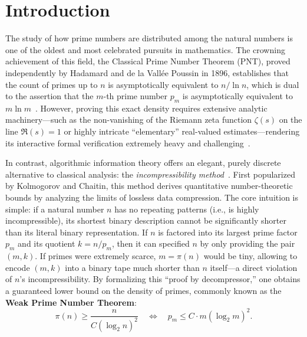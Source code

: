 \documentclass[acmsmall,natbib=false,nonacm]{acmart}
\begin{document}
\maketitle

\section{Introduction}
\label{sec:introduction}

The study of how prime numbers are distributed among the natural numbers is one of the oldest and most celebrated pursuits in mathematics. The crowning achievement of this field, the Classical Prime Number Theorem (PNT), proved independently by Hadamard and de la Vall\'{e}e Poussin in 1896, establishes that the count of primes up to $n$ is asymptotically equivalent to $n / \ln n$, which is dual to the assertion that the $m$-th prime number $p_m$ is asymptotically equivalent to $m \ln m$~\cite{apostol1976introduction}. However, proving this exact density requires extensive analytic machinery—such as the non-vanishing of the Riemann zeta function $\zeta(s)$ on the line $\Re(s) = 1$ or highly intricate ``elementary'' real-valued estimates—rendering its interactive formal verification extremely heavy and challenging~\cite{avigad2007formalPNT}.

In contrast, algorithmic information theory offers an elegant, purely discrete alternative to classical analysis: the \textit{incompressibility method}~\cite{schoning1998gems, li2019introduction}. First popularized by Kolmogorov and Chaitin, this method derives quantitative number-theoretic bounds by analyzing the limits of lossless data compression. The core intuition is simple: if a natural number $n$ has no repeating patterns (i.e., is highly incompressible), its shortest binary description cannot be significantly shorter than its literal binary representation. If $n$ is factored into its largest prime factor $p_m$ and its quotient $k = n / p_m$, then it can specified $n$ by only providing the pair $(m, k)$. If primes were extremely scarce, $m = \pi(n)$ would be tiny, allowing to encode $(m, k)$ into a binary tape much shorter than $n$ itself—a direct violation of $n$'s incompressibility. By formalizing this ``proof by decompressor,'' one obtains a guaranteed lower bound on the density of primes, commonly known as the \textbf{Weak Prime Number Theorem}:
\begin{equation}
    \pi(n) \ge \frac{n}{C (\log_2 n)^2} \quad \Longleftrightarrow \quad p_m \le C \cdot m (\log_2 m)^2.
\end{equation}
\end{document}
